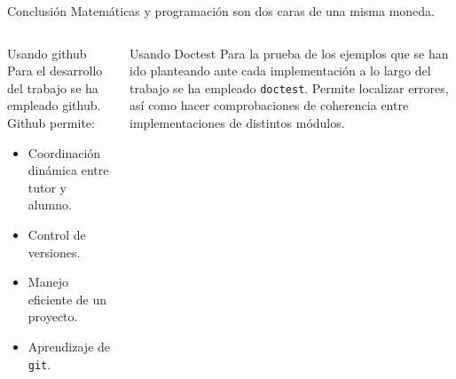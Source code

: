 \documentclass[final]{beamer}
\newlength{\onecolwid}
\newlength{\twocolwid}
\begin{document}
\begin{frame}[t,fragile]
\begin{columns}[t]
\begin{column}{\twocolwid}
\begin{columns}[t,totalwidth=\twocolwid]
\begin{column}{\onecolwid}
\end{column} %

\end{columns} %


\begin{alertblock}{Conclusión}
  Matemáticas y programación son dos caras de una misma moneda.
\end{alertblock} 

  


\begin{columns}[t,totalwidth=\twocolwid] %

\begin{column}{\onecolwid} %

  \begin{block}{Usando github}
    Para el desarrollo del trabajo se ha empleado github. Github permite:
    \begin{itemize}
    \item Coordinación dinámica entre tutor y alumno.
    \item Control de versiones.
    \item Manejo eficiente de un proyecto.
    \item Aprendizaje de \texttt{git}.
    \end{itemize}
    
  \end{block}



\end{column} %


\begin{column}{\onecolwid} %

  \begin{block}{Usando Doctest}
    Para la prueba de los ejemplos que se han ido planteando
    ante cada implementación a lo largo del trabajo se ha empleado
    \texttt{doctest}. Permite localizar errores, así como
    hacer comprobaciones de coherencia entre implementaciones
    de distintos módulos.
  \end{block}
  

\end{column}
\end{columns}
\end{column}
\end{columns}
\end{frame}
\end{document}
